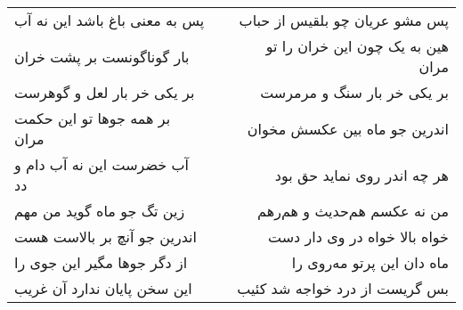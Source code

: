 \begin{center}
\begin{longtable}{l p{0.5cm} r}
\\
پس به معنی باغ باشد این نه آب
&&
پس مشو عریان چو بلقیس از حباب
\\
بار گوناگونست بر پشت خران
&&
هین به یک چون این خران را تو مران
\\
بر یکی خر بار لعل و گوهرست
&&
بر یکی خر بار سنگ و مرمرست
\\
بر همه جوها تو این حکمت مران
&&
اندرین جو ماه بین عکسش مخوان
\\
آب خضرست این نه آب دام و دد
&&
هر چه اندر روی نماید حق بود
\\
زین تگ جو ماه گوید من مهم
&&
من نه عکسم هم‌حدیث و هم‌رهم
\\
اندرین جو آنچ بر بالاست هست
&&
خواه بالا خواه در وی دار دست
\\
از دگر جوها مگیر این جوی را
&&
ماه دان این پرتو مه‌روی را
\\
این سخن پایان ندارد آن غریب
&&
بس گریست از درد خواجه شد کئیب
\\
\end{longtable}
\end{center}
